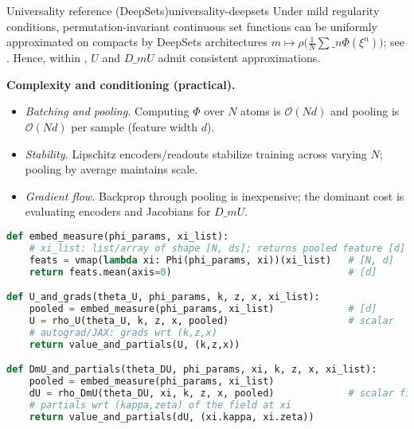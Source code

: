 ﻿\documentclass[11pt,letterpaper,oneside]{article}
\numberwithin{equation}{section}
\newcommand{\1}{\mathbf{1}}
\newcommand{\dmU}{D\_m U}
\newcommand{\Dm}{D\_m}
\begin{document}
\begin{lemma}{Universality reference (DeepSets)}{universality-deepsets}
Under mild regularity conditions, permutation-invariant continuous set functions can be uniformly approximated on compacts by DeepSets architectures $m\mapsto \rho\big(\tfrac{1}{N}\sum\_n \Phi(\xi^n)\big)$; see \cite{zaheer2017deepsets}. Hence, within , $U$ and $\Dm U$ admit consistent approximations.
\end{lemma}

\begin{tcolorbox}[mathstyle]
\textbf{Complexity and conditioning (practical).}
\begin{itemize}[leftmargin=1.15em,itemsep=0.25em]
  \item \emph{Batching and pooling.} Computing $\Phi$ over $N$ atoms is $\mathcal O(N d)$ and pooling is $\mathcal O(N d)$ per sample (feature width $d$).
  \item \emph{Stability.} Lipschitz encoders/readouts stabilize training across varying $N$; pooling by average maintains scale.
  \item \emph{Gradient flow.} Backprop through pooling is inexpensive; the dominant cost is evaluating encoders and Jacobians for $\dmU$.
\end{itemize}
\end{tcolorbox}

\begin{lstlisting}[language=Python,caption={DeepSets-style pooling for U and D\_m U (pseudo-JAX)}]
def embed_measure(phi_params, xi_list):
    # xi_list: list/array of shape [N, ds]; returns pooled feature [d]
    feats = vmap(lambda xi: Phi(phi_params, xi))(xi_list)   # [N, d]
    return feats.mean(axis=0)                               # [d]

def U_and_grads(theta_U, phi_params, k, z, x, xi_list):
    pooled = embed_measure(phi_params, xi_list)             # [d]
    U = rho_U(theta_U, k, z, x, pooled)                     # scalar
    # autograd/JAX: grads wrt (k,z,x)
    return value_and_partials(U, (k,z,x))

def DmU_and_partials(theta_DU, phi_params, xi, k, z, x, xi_list):
    pooled = embed_measure(phi_params, xi_list)
    dU = rho_DmU(theta_DU, xi, k, z, x, pooled)             # scalar field at xi
    # partials wrt (kappa,zeta) of the field at xi
    return value_and_partials(dU, (xi.kappa, xi.zeta))
\end{lstlisting}
\end{document}
